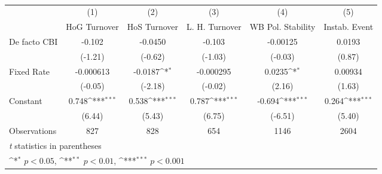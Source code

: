\begin{table}[htbp]\centering
\def\sym#1{\ifmmode^{#1}\else\(^{#1}\)\fi}
\caption{\label{lkmultIndFEDF}}
\begin{tabular}{l*{5}{c}}
\toprule
                                        &\multicolumn{1}{c}{(1)}&\multicolumn{1}{c}{(2)}&\multicolumn{1}{c}{(3)}&\multicolumn{1}{c}{(4)}&\multicolumn{1}{c}{(5)}\\
                                        &\multicolumn{1}{c}{HoG Turnover}&\multicolumn{1}{c}{HoS Turnover}&\multicolumn{1}{c}{L. H. Turnover}&\multicolumn{1}{c}{WB Pol. Stability}&\multicolumn{1}{c}{Instab. Event}\\
\midrule
De facto CBI                            &   -0.102         &  -0.0450         &   -0.103         & -0.00125         &   0.0193         \\
                                        &  (-1.21)         &  (-0.62)         &  (-1.03)         &  (-0.03)         &   (0.87)         \\
\addlinespace
Fixed Rate                              &-0.000613         &  -0.0187\sym{*}  &-0.000295         &   0.0235\sym{*}  &  0.00934         \\
                                        &  (-0.05)         &  (-2.18)         &  (-0.02)         &   (2.16)         &   (1.63)         \\
\addlinespace
Constant                                &    0.748\sym{***}&    0.538\sym{***}&    0.787\sym{***}&   -0.694\sym{***}&    0.264\sym{***}\\
                                        &   (6.44)         &   (5.43)         &   (6.75)         &  (-6.51)         &   (5.40)         \\
\midrule
Observations                            &      827         &      828         &      654         &     1146         &     2604         \\
\bottomrule
\multicolumn{6}{l}{\footnotesize \textit{t} statistics in parentheses}\\
\multicolumn{6}{l}{\footnotesize \sym{*} \(p<0.05\), \sym{**} \(p<0.01\), \sym{***} \(p<0.001\)}\\
\end{tabular}
\end{table}
